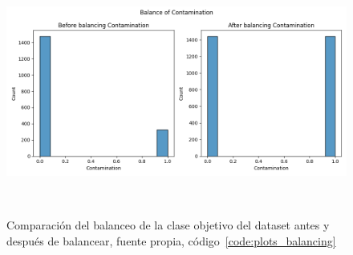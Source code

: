 \begin{figure}[!ht]
    \centering
    \includegraphics[width=0.6\linewidth]{media/images/balance.png}
    \caption{Comparación del balanceo de la clase objetivo del \gls{dataset} antes y después de balancear, fuente propia, código\ \ref{code:plots_balancing}}\ \label{fig:balance}
\end{figure}